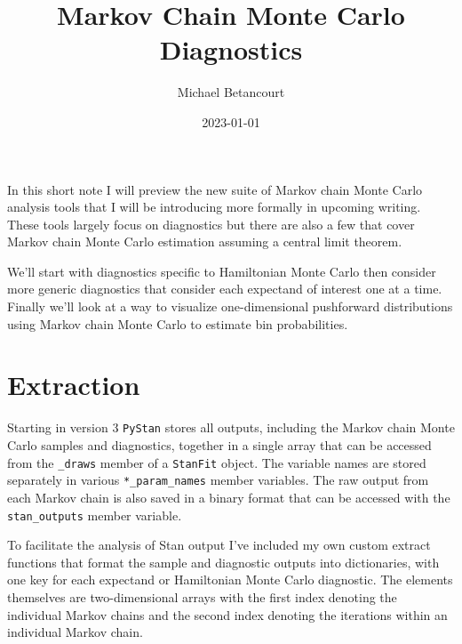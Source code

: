 \documentclass[
  letterpaper,
  DIV=11,
  numbers=noendperiod]{scrartcl}
\title{Markov Chain Monte Carlo Diagnostics}
\author{Michael Betancourt}
\date{2023-01-01}
\renewcommand*\contentsname{Table of contents}
\newcommand\contentsname{Table of contents}
\begin{document}
\maketitle

\renewcommand*\contentsname{Table of contents}
{
\hypersetup{linkcolor=}
\setcounter{tocdepth}{3}
\tableofcontents
}
In this short note I will preview the new suite of Markov chain Monte
Carlo analysis tools that I will be introducing more formally in
upcoming writing. These tools largely focus on diagnostics but there are
also a few that cover Markov chain Monte Carlo estimation assuming a
central limit theorem.

We'll start with diagnostics specific to Hamiltonian Monte Carlo then
consider more generic diagnostics that consider each expectand of
interest one at a time. Finally we'll look at a way to visualize
one-dimensional pushforward distributions using Markov chain Monte Carlo
to estimate bin probabilities.

\section{Extraction}\label{extraction}

Starting in version 3 \texttt{PyStan} stores all outputs, including the
Markov chain Monte Carlo samples and diagnostics, together in a single
array that can be accessed from the \texttt{\_draws} member of a
\texttt{StanFit} object. The variable names are stored separately in
various \texttt{*\_param\_names} member variables. The raw output from
each Markov chain is also saved in a binary format that can be accessed
with the \texttt{stan\_outputs} member variable.

To facilitate the analysis of Stan output I've included my own custom
extract functions that format the sample and diagnostic outputs into
dictionaries, with one key for each expectand or Hamiltonian Monte Carlo
diagnostic. The elements themselves are two-dimensional arrays with the
first index denoting the individual Markov chains and the second index
denoting the iterations within an individual Markov chain.
\end{document}
